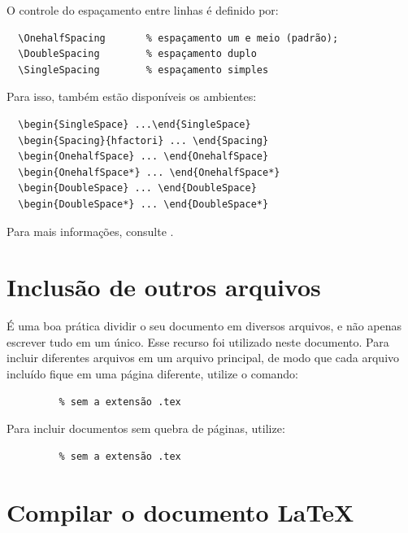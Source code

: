 O controle do espaçamento entre linhas é
definido por:
\begin{verbatim}
  \OnehalfSpacing       % espaçamento um e meio (padrão); 
  \DoubleSpacing        % espaçamento duplo
  \SingleSpacing        % espaçamento simples	
\end{verbatim}

Para isso, também estão disponíveis os ambientes:
\begin{verbatim}
  \begin{SingleSpace} ...\end{SingleSpace}
  \begin{Spacing}{hfactori} ... \end{Spacing}
  \begin{OnehalfSpace} ... \end{OnehalfSpace}
  \begin{OnehalfSpace*} ... \end{OnehalfSpace*}
  \begin{DoubleSpace} ... \end{DoubleSpace}
  \begin{DoubleSpace*} ... \end{DoubleSpace*} 
\end{verbatim}

Para mais informações, consulte .

\section{Inclusão de outros arquivos}\label{sec-include}

É uma boa prática dividir o seu documento em diversos arquivos, e não
apenas escrever tudo em um único. Esse recurso foi utilizado neste
documento. Para incluir diferentes arquivos em um arquivo principal,
de modo que cada arquivo incluído fique em uma página diferente, utilize o
comando:
\begin{verbatim}
         % sem a extensão .tex
\end{verbatim}

Para incluir documentos sem quebra de páginas, utilize:
\begin{verbatim}
         % sem a extensão .tex
\end{verbatim}

\section{Compilar o documento \LaTeX}

